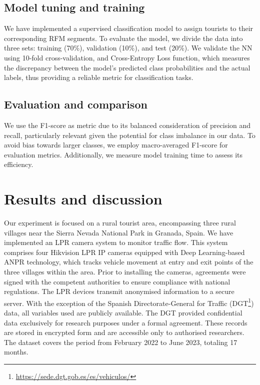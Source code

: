 \documentclass{ws-ijitdm}
\begin{document}
\subsection{Model tuning and training}

We have implemented a supervised classification model to assign tourists to their corresponding RFM segments. To evaluate the model, we divide the data into three sets: training (70\%), validation (10\%), and test (20\%). We validate  the NN using 10-fold cross-validation, and  Cross-Entropy Loss function\cite{42}, which measures the discrepancy between the model's predicted class probabilities and the actual labels, thus providing a reliable metric for classification tasks.

\subsection{Evaluation and comparison}

We use the F1-score as metric due to its balanced consideration of precision and recall, particularly relevant given the potential for class imbalance in our data\cite{43,44}. To avoid bias towards larger classes, we employ macro-averaged F1-score for evaluation metrics. Additionally, we measure model training time to assess its efficiency.

\section{Results and discussion} \label{sec:experiment}

Our experiment is focused on a rural tourist area, encompassing three rural villages near the Sierra Nevada National Park in Granada, Spain. We have implemented an LPR camera system to monitor traffic flow. This system comprises four Hikvision LPR IP cameras equipped with Deep Learning-based ANPR technology, which tracks vehicle movement at entry and exit points of the three villages within the area. {\color{black} Prior to installing the cameras, agreements were signed with the competent authorities to ensure compliance with national regulations. The LPR devices transmit anonymised information to a secure server. With the exception of the Spanish Directorate-General for Traffic (DGT\footnote{\url{https://sede.dgt.gob.es/es/vehiculos/}}) data, all variables used are publicly available. The DGT provided confidential data exclusively for research purposes under a formal agreement. These records are stored in encrypted form and are accessible only to authorised researchers.} The dataset covers the period from February 2022 to June 2023, totaling 17 months. 
\end{document}

